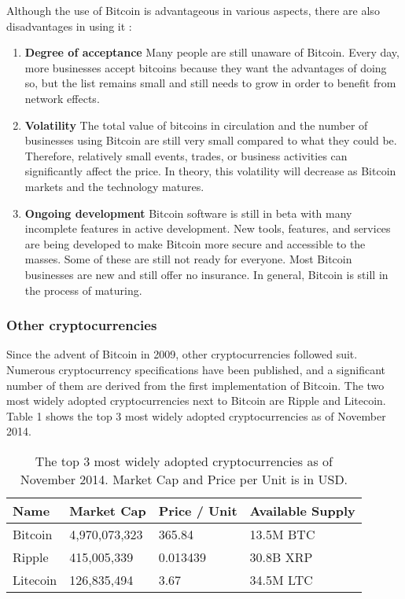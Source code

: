 \documentclass{acm_proc_article-sp}
\begin{document}
Although the use of Bitcoin is advantageous in various aspects, there are also disadvantages in using it \cite{Bitcoin:2014}:
\begin{enumerate}
	\item \textbf{Degree of acceptance} Many people are still unaware of Bitcoin. Every day, more businesses accept bitcoins because they want the advantages of doing so, but the list remains small and still needs to grow in order to benefit from network effects.
	\item \textbf{Volatility} The total value of bitcoins in circulation and the number of businesses using Bitcoin are still very small compared to what they could be. Therefore, relatively small events, trades, or business activities can significantly affect the price. In theory, this volatility will decrease as Bitcoin markets and the technology matures.
	\item \textbf{Ongoing development} Bitcoin software is still in beta with many incomplete features in active development. New tools, features, and services are being developed to make Bitcoin more secure and accessible to the masses. Some of these are still not ready for everyone. Most Bitcoin businesses are new and still offer no insurance. In general, Bitcoin is still in the process of maturing.
\end{enumerate}


\subsubsection{Other cryptocurrencies}
Since the advent of Bitcoin in 2009, other cryptocurrencies followed suit. Numerous cryptocurrency specifications have been published, and a significant number of them are derived from the first implementation of Bitcoin. The two most widely adopted cryptocurrencies next to Bitcoin are Ripple and Litecoin. Table 1 shows the top 3 most widely adopted cryptocurrencies as of November 2014.


\begin{table}[h]
\centering
\begin{tabular}{ | l | l | l | l | }
\hline
  Name & Market Cap & Price / Unit & Available Supply \\ \hline 
  Bitcoin   & 4,970,073,323 & 365.84 & 13.5M BTC \\ \hline
  Ripple    & 415,005,339 & 0.013439 & 30.8B XRP \\ \hline
  Litecoin  & 126,835,494 & 3.67 & 34.5M LTC \\ \hline

\end{tabular}
  \caption{The top 3 most widely adopted cryptocurrencies as of November 2014. Market Cap and Price per Unit is in USD.}
\end{table}
\end{document}
